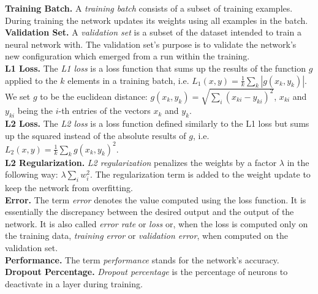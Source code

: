 \noindent\textbf{Training Batch.} A \textit{training batch} consists of a subset of training examples. During training the network updates its weights using all examples in the batch. \\

\noindent\textbf{Validation Set.} A \textit{validation set} is a subset of the dataset intended to train a neural network with. The validation set's purpose is to validate the network's new configuration which emerged from a run within the training. \\

\noindent\textbf{L1 Loss.} The \textit{L1 loss} is a loss function that sums up the results of the function $g$ applied to the $k$ elements in a training batch, i.e. $L_1(x, y) = \frac{1}{k} \sum\limits_k |g(x_k, y_k)|$. We set $g$ to be the euclidean distance: $g(x_k, y_k) = \sqrt{\sum\limits_i (x_{ki} - y_{ki})^2}$, $x_{ki}$ and $y_{ki}$ being the $i$-th entries of the vectors $x_k$ and $y_k$. \\

\noindent\textbf{L2 Loss.} The \textit{L2 loss} is a loss function defined similarly to the L1 loss but sums up the squared instead of the absolute results of $g$, i.e. $L_2(x, y) = \frac{1}{k} \sum\limits_k g(x_k, y_k)^2$. \\

\noindent\textbf{L2 Regularization.} \textit{L2 regularization} penalizes the weights by a factor $\lambda$ in the following way: $\lambda \sum\limits_i w_i^2$. The regularization term is added to the weight update to keep the network from overfitting. \\

\noindent\textbf{Error.} The term \textit{error} denotes the value computed using the loss function. It is essentially the discrepancy between the desired output and the output of the network. It is also called \textit{error rate} or \textit{loss} or, when the loss is computed only on the training data, \textit{training error} or \textit{validation error}, when computed on the validation set. \\

\noindent\textbf{Performance.} The term \textit{performance} stands for the network's accuracy. \\

\noindent\textbf{Dropout Percentage.} \textit{Dropout percentage} is the percentage of neurons to deactivate in a layer during training. \\

